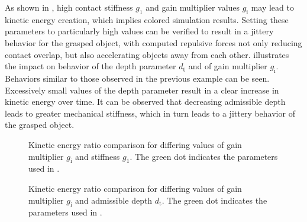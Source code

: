 As shown in , high contact stiffness $g_\text{1}$ and gain multiplier values $g_\text{i}$ may lead to kinetic energy creation, which implies colored simulation results. Setting these parameters to particularly high values can be verified to result in a jittery behavior for the grasped object, with computed repulsive forces not only reducing contact overlap, but also accelerating objects away from each other.
 illustrates the impact on behavior of the depth parameter $d_\text{t}$ and of gain multiplier $g_\text{i}$. Behaviors similar to those observed in the previous example can be seen. Excessively small values of the depth parameter result in a clear increase in kinetic energy over time. It can be observed that decreasing admissible depth leads to greater mechanical stiffness, which in turn leads to a jittery behavior of the grasped object.
%
\begin{figure}
	\centering
	\caption{Kinetic energy ratio comparison for differing values of gain multiplier $g_\text{i}$ and stiffness $g_1$. The green dot indicates the parameters used in .}
	\label{fig:impcoeffstiffnesscomp}
\end{figure}
%
\begin{figure}
	\centering
	\caption{Kinetic energy ratio comparison for differing values of gain multiplier $g_\text{i}$ and admissible depth $d_\text{t}$. The green dot indicates the parameters used in .}
	\label{fig:depthstiffnesscomp}
\end{figure}
%
